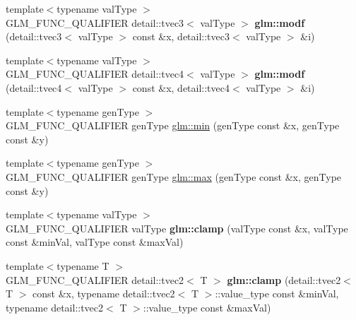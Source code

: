 \begin{DoxyCompactItemize}
\item 
\hypertarget{namespaceglm_a0d5f8bb5115eaca517b697509de396df}{}{\footnotesize template$<$typename val\+Type $>$ }\\G\+L\+M\+\_\+\+F\+U\+N\+C\+\_\+\+Q\+U\+A\+L\+I\+F\+I\+E\+R detail\+::tvec3$<$ val\+Type $>$ {\bfseries glm\+::modf} (detail\+::tvec3$<$ val\+Type $>$ const \&x, detail\+::tvec3$<$ val\+Type $>$ \&i)\label{namespaceglm_a0d5f8bb5115eaca517b697509de396df}

\item 
\hypertarget{namespaceglm_a6c9328d6bc7d557600ec52f2e5115ef5}{}{\footnotesize template$<$typename val\+Type $>$ }\\G\+L\+M\+\_\+\+F\+U\+N\+C\+\_\+\+Q\+U\+A\+L\+I\+F\+I\+E\+R detail\+::tvec4$<$ val\+Type $>$ {\bfseries glm\+::modf} (detail\+::tvec4$<$ val\+Type $>$ const \&x, detail\+::tvec4$<$ val\+Type $>$ \&i)\label{namespaceglm_a6c9328d6bc7d557600ec52f2e5115ef5}

\item 
{\footnotesize template$<$typename gen\+Type $>$ }\\G\+L\+M\+\_\+\+F\+U\+N\+C\+\_\+\+Q\+U\+A\+L\+I\+F\+I\+E\+R gen\+Type \hyperlink{group__core__func__common_ga3dc90dbd66c9ca1dd5625c93d9c50f02}{glm\+::min} (gen\+Type const \&x, gen\+Type const \&y)
\item 
{\footnotesize template$<$typename gen\+Type $>$ }\\G\+L\+M\+\_\+\+F\+U\+N\+C\+\_\+\+Q\+U\+A\+L\+I\+F\+I\+E\+R gen\+Type \hyperlink{group__core__func__common_gaa228561a9da55898f8f72ad2403fafac}{glm\+::max} (gen\+Type const \&x, gen\+Type const \&y)
\item 
\hypertarget{namespaceglm_a435097f73fa7b698ddc54945bfba1c34}{}{\footnotesize template$<$typename val\+Type $>$ }\\G\+L\+M\+\_\+\+F\+U\+N\+C\+\_\+\+Q\+U\+A\+L\+I\+F\+I\+E\+R val\+Type {\bfseries glm\+::clamp} (val\+Type const \&x, val\+Type const \&min\+Val, val\+Type const \&max\+Val)\label{namespaceglm_a435097f73fa7b698ddc54945bfba1c34}

\item 
\hypertarget{namespaceglm_ae7c2c75cfb6649f39e832598cb0842f8}{}{\footnotesize template$<$typename T $>$ }\\G\+L\+M\+\_\+\+F\+U\+N\+C\+\_\+\+Q\+U\+A\+L\+I\+F\+I\+E\+R detail\+::tvec2$<$ T $>$ {\bfseries glm\+::clamp} (detail\+::tvec2$<$ T $>$ const \&x, typename detail\+::tvec2$<$ T $>$\+::value\+\_\+type const \&min\+Val, typename detail\+::tvec2$<$ T $>$\+::value\+\_\+type const \&max\+Val)\label{namespaceglm_ae7c2c75cfb6649f39e832598cb0842f8}


\end{DoxyCompactItemize}
